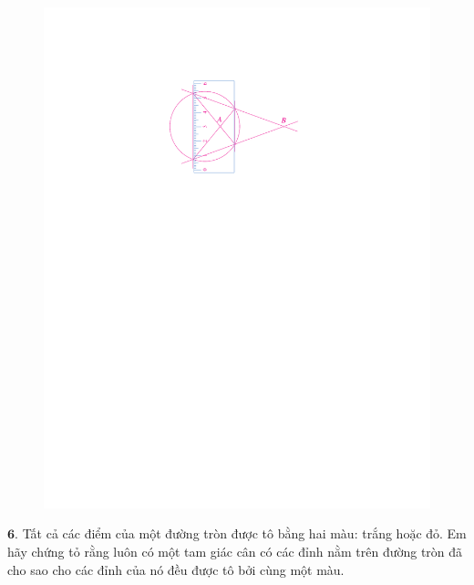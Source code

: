 \begin{multicols}{2}
	\begin{figure}[H]
		\centering
		\vspace*{-5pt}
		\captionsetup{labelformat= empty, justification=centering}
		\includegraphics[width=1\linewidth]{thuoc}
		\vspace*{-5pt}
	\end{figure}
	$\pmb{6.}$ Tất cả các điểm của một đường tròn được tô bằng hai màu: trắng hoặc đỏ. Em hãy chứng tỏ rằng luôn có một tam giác cân có các đỉnh nằm trên đường tròn đã cho sao cho các đỉnh của nó đều được tô bởi cùng một màu.
	\begin{figure}[H]
		\centering
		\captionsetup{labelformat= empty, justification=centering}

\end{figure}
\end{multicols}
